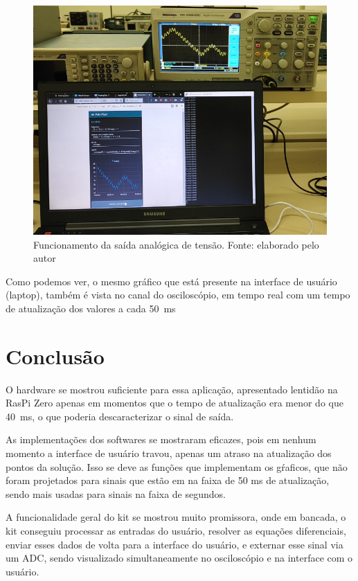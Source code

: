 \documentclass[journal]{IEEEtranTIE}
\begin{document}
\begin{figure}[H]
	\includegraphics[width=\linewidth]{img/real_running.png}
    \caption{Funcionamento da saída analógica de tensão. Fonte: elaborado pelo autor}
    \label{fig:real}
\end{figure}

Como podemos ver, o mesmo gráfico que está presente na interface de usuário (laptop), também é vista no canal do osciloscópio, em tempo real com um tempo de atualização dos valores a cada \SI{50}{\milli\second}



\section{Conclusão}

O hardware se mostrou suficiente para essa aplicação, apresentado lentidão na RasPi Zero apenas em momentos que o tempo de atualização era menor do que \SI{40}{\milli\second}, o que poderia descaracterizar o sinal de saída.

As implementações dos softwares se mostraram eficazes, pois em nenhum momento a interface de usuário travou, apenas um atraso na atualização dos pontos da solução. Isso se deve as funções que implementam os gŕaficos, que não foram projetados para sinais que estão em na faixa de 50 ms de atualização, sendo mais usadas para sinais na faixa de segundos.

A funcionalidade geral do kit se mostrou muito promissora, onde em bancada, o kit conseguiu processar as entradas do usuário, resolver as equações diferenciais, enviar esses dados de volta para a interface do usuário, e externar esse sinal via um ADC, sendo visualizado simultaneamente no osciloscópio e na interface com o usuário.
\end{document}
